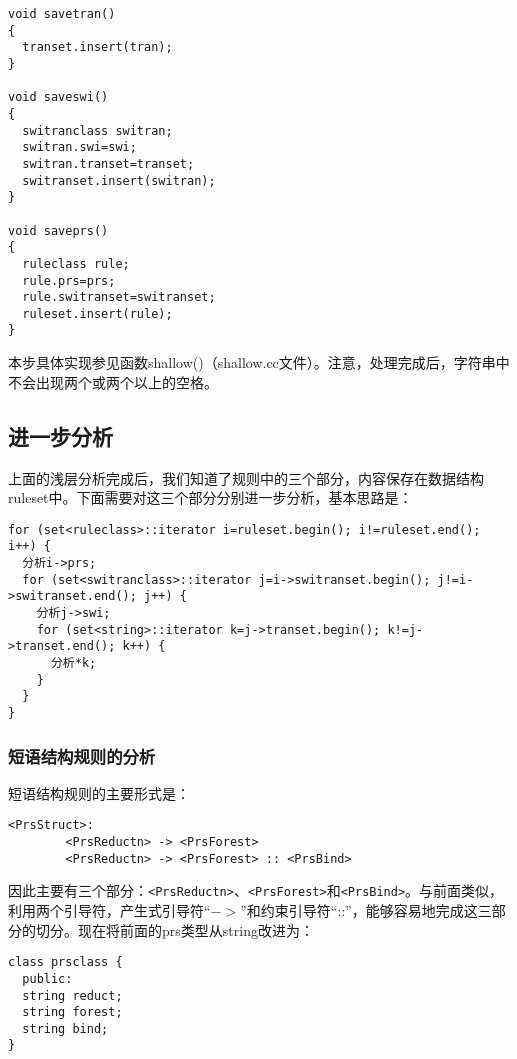 \documentclass{article}
\begin{document}
\begin{CJK}{UTF8}{gbsn}
\begin{verbatim}
void savetran()
{
  transet.insert(tran);
}

void saveswi()
{
  switranclass switran;
  switran.swi=swi;
  switran.transet=transet;
  switranset.insert(switran);
}

void saveprs()
{
  ruleclass rule;
  rule.prs=prs;
  rule.switranset=switranset;
  ruleset.insert(rule);
}
\end{verbatim}

本步具体实现参见函数shallow()（shallow.cc文件）。注意，处理完成后，字符串中不会出现两个或两个以上的空格。

\subsection{进一步分析}

上面的浅层分析完成后，我们知道了规则中的三个部分，内容保存在数据结构ruleset中。下面需要对这三个部分分别进一步分析，基本思路是：

\vspace{1pc}
\begin{verbatim}
for (set<ruleclass>::iterator i=ruleset.begin(); i!=ruleset.end(); i++) {
  分析i->prs;
  for (set<switranclass>::iterator j=i->switranset.begin(); j!=i->switranset.end(); j++) {
    分析j->swi;
    for (set<string>::iterator k=j->transet.begin(); k!=j->transet.end(); k++) {
      分析*k;
    }
  }
}
\end{verbatim}

\subsubsection{短语结构规则的分析}

短语结构规则的主要形式是：
\begin{verbatim}
<PrsStruct>:
        <PrsReductn> -> <PrsForest>
        <PrsReductn> -> <PrsForest> :: <PrsBind>
\end{verbatim}
因此主要有三个部分：\verb|<PrsReductn>|、\verb|<PrsForest>|和\verb|<PrsBind>|。与前面类似，利用两个引导符，产生式引导符“$->$”和约束引导符“::”，能够容易地完成这三部分的切分。现在将前面的prs类型从string改进为：
\begin{verbatim}
class prsclass {
  public:
  string reduct;
  string forest;
  string bind;
}
\end{verbatim}

\vspace{1pc}
\begin{center}
\begin{tikzpicture}[->, >=stealth, shorten >=1pt, auto, node distance=2cm, semithick, inner sep=2pt, bend angle=15]


\end{tikzpicture}
\end{center}
\end{CJK}
\end{document}
